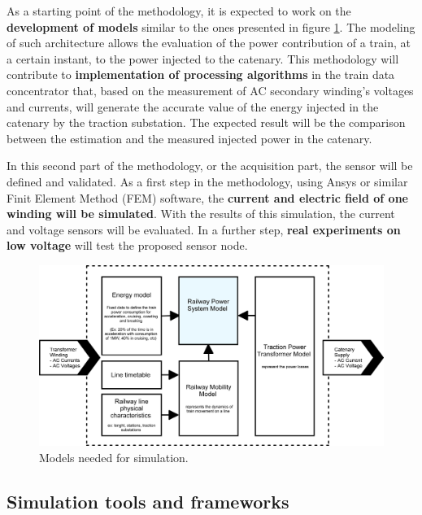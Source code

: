 As a starting point of the methodology, it is expected to work on the \textbf{development of models} similar to the ones presented in figure \ref{fig:4.methodElectrical}. The modeling of such architecture allows the evaluation of the power contribution of a train, at a certain instant, to the power injected to the catenary. This methodology will contribute to \textbf{implementation of processing algorithms} in the train data concentrator that, based on the measurement of AC secondary winding's voltages and currents, will generate the accurate value of the energy injected in the catenary by the traction substation. The expected result will be the comparison between the estimation and the measured injected power in the catenary.

In this second part of the methodology, or the acquisition part, the sensor will be defined and validated. As a first step in the methodology, using Ansys or similar Finit Element Method (FEM) software, the \textbf{current and electric field of one winding will be simulated}. With the results of this simulation, the current and voltage sensors will be evaluated. In a further step, \textbf{real experiments on low voltage} will test the proposed sensor node.



\begin{figure}[h!]
	\centering
	\includegraphics[width=1\textwidth,keepaspectratio]{figures/4.Method/methodElectrical}
	\caption{Models needed for simulation.}
	\label{fig:4.methodElectrical}
\end{figure}



\subsection{Simulation tools and frameworks}


